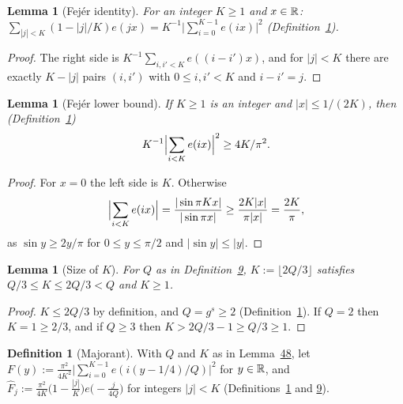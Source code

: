\documentclass[11pt]{article}
\newcounter{hffc}
\theoremstyle{definition}\newtheorem{hffdef}[hffc]{Definition}
\theoremstyle{plain}\newtheorem{hfflem}[hffc]{Lemma}\newtheorem{hffthm}[hffc]{Theorem}
\theoremstyle{remark}\newtheorem{hffrem}[hffc]{Remark}
\newcommand{\hffcost}{}
\newcommand{\setcost}[1]{\renewcommand{\hffcost}{#1}}
\begin{document}
\begin{hfflem}[Fej\'er identity]\label{L:fejer}
For an integer $K\ge1$ and $x\in\mathbb{R}$: $\sum_{|j|<K}(1-|j|/K)e(jx)=K^{-1}\bigl|\sum_{i=0}^{K-1}e(ix)\bigr|^2$ (Definition~\hyperref[D:conv]{1}).
\par\nopagebreak{}
\end{hfflem}
\begin{proof}\setcost{length 98/300}The right side is $K^{-1}\sum_{i,i'<K}e((i-i')x)$, and for $|j|<K$ there are exactly $K-|j|$ pairs $(i,i')$ with $0\le i,i'<K$ and $i-i'=j$.
\end{proof}

\begin{hfflem}[Fej\'er lower bound]\label{L:fejerlow}
If $K\ge1$ is an integer and $|x|\le1/(2K)$, then (Definition~\hyperref[D:conv]{1}) \[K^{-1}\Bigl|\sum_{i<K}e(ix)\Bigr|^2\ge4K/\pi^2.\]
\par\nopagebreak{}
\end{hfflem}
\begin{proof}\setcost{length 104/300}For $x=0$ the left side is $K$. Otherwise \[\Bigl|\sum_{i<K}e(ix)\Bigr|=\frac{|\sin\pi Kx|}{|\sin\pi x|}\ge\frac{2K|x|}{\pi|x|}=\frac{2K}\pi,\] as $\sin y\ge2y/\pi$ for $0\le y\le\pi/2$ and $|\sin y|\le|y|$.
\end{proof}

\begin{hfflem}[Size of $K$]\label{L:K}
For $Q$ as in Definition~\hyperref[D:psi]{9}, $K:=\lfloor2Q/3\rfloor$ satisfies $Q/3\le K\le2Q/3<Q$ and $K\ge1$.
\par\nopagebreak{}
\end{hfflem}
\begin{proof}\setcost{length 86/300}$K\le2Q/3$ by definition, and $Q=g^s\ge2$ (Definition~\hyperref[D:conv]{1}). If $Q=2$ then $K=1\ge2/3$, and if $Q\ge3$ then $K>2Q/3-1\ge Q/3\ge1$.
\end{proof}

\begin{hffdef}[Majorant]\label{D:maj}
With $Q$ and $K$ as in Lemma~\hyperref[L:K]{48}, let $F(y):=\frac{\pi^2}{4K^2}\bigl|\sum_{i=0}^{K-1}e(i(y-1/4)/Q)\bigr|^2$ for $y\in\mathbb{R}$, and $\hat F_j:=\frac{\pi^2}{4K}\bigl(1-\frac{|j|}K\bigr)e\bigl(-\frac j{4Q}\bigr)$ for integers $|j|<K$ (Definitions~\hyperref[D:conv]{1} and \hyperref[D:psi]{9}).
\par\nopagebreak{}
\end{hffdef}
\end{document}
